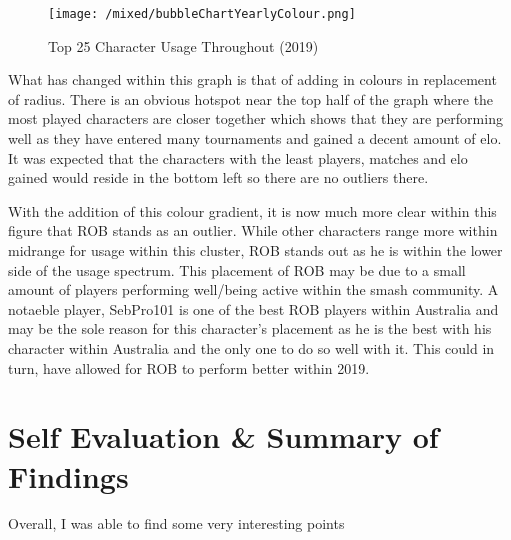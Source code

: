 \documentclass[11pt, oneside, a4paper]{article}
\begin{document}
\begin{figure}[!ht]
	\centerline{\texttt{[image: /mixed/bubbleChartYearlyColour.png]}}
	\caption{Top 25 Character Usage Throughout (2019)}
	\label{fig:figure13}
\end{figure}
What has changed within this graph is that of adding in colours in replacement of radius. There is an obvious hotspot near the top half of the graph where the most played characters are closer together which shows that they are performing well as they have entered many tournaments and gained a decent amount of elo. It was expected that the characters with the least players, matches and elo gained would reside in the bottom left so there are no outliers there. 

With the addition of this colour gradient, it is now much more clear within this figure that ROB stands as an outlier. While other characters range more within midrange for usage within this cluster, ROB stands out as he is within the lower side of the usage spectrum. This placement of ROB may be due to a small amount of players performing well/being active within the smash community. A notaeble player, SebPro101 is one of the best ROB players within Australia and may be the sole reason for this character's placement as he is the best with his character within Australia and the only one to do so well with it. This could in turn, have allowed for ROB to perform better within 2019.

\newapage
\section{Self Evaluation & Summary of Findings}
Overall, I was able to find some very interesting points 
\end{document}
